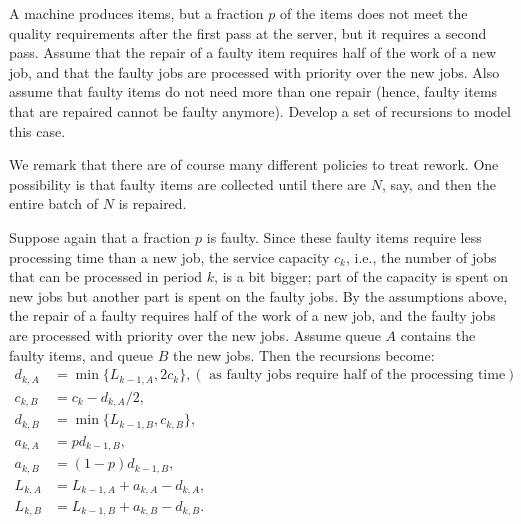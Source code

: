 \begin{extra}[Rework] 

 A machine produces items, but a fraction $p$ of the items does not meet the quality requirements after the first pass at the server, but it requires a second pass.
 Assume that the repair of a faulty item requires half of the work of a new job, and that the faulty jobs are processed with priority over the new jobs.
 Also assume that faulty items do not need more than one repair (hence, faulty items that are repaired cannot be faulty anymore).
 Develop a set of recursions to model this case.


 We remark that there are of course many different policies to treat rework.
 One possibility is that faulty items are collected until there are $N$, say, and then the entire batch of $N$ is repaired.
\begin{solution}
 Suppose again that a fraction $p$ is faulty. Since these faulty
 items require less processing time than a new job, the service
 capacity $c_k$, i.e., the number of jobs that can be processed in
 period $k$, is a bit bigger; part of the capacity is spent on new
 jobs but another part is spent on the faulty jobs. By the
 assumptions above, the repair of a faulty requires half of the
 work of a new job, and the faulty jobs are processed with priority
 over the new jobs. Assume queue $A$ contains the faulty items, and
 queue $B$ the new jobs. Then the recursions become:
\begin{equation*}
 \begin{split}
 d_{k,A} &= \min\{L_{k-1, A}, 2c_k\}, (\text{ as faulty jobs require half of the processing time})\\
 c_{k,B} &= c_k - d_{k,A}/2, \\
 d_{k,B} &= \min\{L_{k-1, B}, c_{k,B}\}, \\
 a_{k,A} &= p d_{k-1, B}, \\
 a_{k,B} &= (1 - p) d_{k-1, B}, \\
 L_{k,A} &= L_{k-1, A} + a_{k,A} - d_{k,A}, \\
 L_{k,B} &= L_{k-1, B} + a_{k,B} - d_{k,B}.
 \end{split}
\end{equation*}
\end{solution}
\end{extra}


